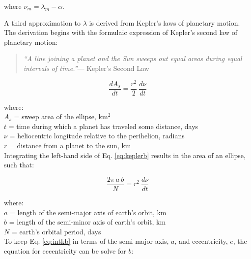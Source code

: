 \noindent where $\nu_m = \lambda_m - \alpha$. 

A third approximation to $\lambda$ is derived from Kepler's laws of planetary motion. 
The derivation begins with the formulaic expression of Kepler's second law of planetary motion:

\begin{quote}
	\textit{``A line joining a planet and the Sun sweeps out equal areas during equal intervals of time.''}--- Kepler's Second Law
\end{quote}

\begin{equation}
\label{eq:keplerb}
	\frac{dA_s}{dt} = \frac{r^2}{2} \: \frac{d\nu}{dt}
\end{equation} 

\noindent where:\\
\indent $A_s$ = sweep area of the ellipse, km$^{2}$ \\
\indent $t$ = time during which a planet has traveled some distance, days\\
\indent $\nu$ = heliocentric longitude relative to the perihelion, radians \\
\indent $r$ = distance from a planet to the sun, km \\

Integrating the left-hand side of Eq. \ref{eq:keplerb} results in the area of an ellipse, such that:

\begin{equation}
\label{eq:intkb}
	\frac{2\pi \: a \: b}{N} = r^2\:\frac{d\nu}{dt}
\end{equation} 

\noindent where:\\
\indent $a$ = length of the semi-major axis of earth's orbit, km \\
\indent $b$ = length of the semi-minor axis of earth's orbit, km \\
\indent $N$ = earth's orbital period, days\\

To keep Eq. \ref{eq:intkb} in terms of the semi-major axis, $a$, and eccentricity, $e$, the equation for eccentricity can be solve for $b$:

